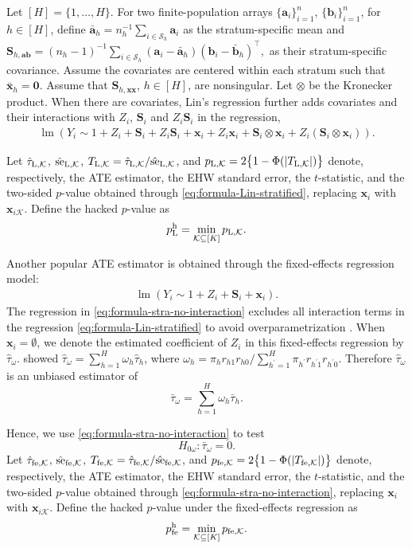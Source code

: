 \documentclass[12pt]{article}
\newcommand{\hpfe}{p_\textnormal{fe}^{\textnormal{h}}}
\newcommand{\se}{\textnormal{se}}
\newcommand{\lmm}{\operatorname{lm}}
\newcommand{\Lin}{\textnormal{L}}
\newcommand{\mk}{\mathcal{K}}
\newcommand{\ms}{\mathcal{S}}
\newcommand{\fe}{\textnormal{fe}}
\newcommand{\bs}{\boldsymbol}
\newcommand{\hpL}{p_\textnormal{L}^{\textnormal{h}}}
\begin{document}
Let $[H] = \{1,\dots,H\}$. For two finite-population arrays $\{\bs{a}_i\}_{i=1}^n$, $\{\bs{b}_i\}_{i=1}^n$, for $h\in [H]$, define $\bar{\bs{a}}_{ h } = n_{ h }^{-1}\sum_{i\in \ms_{ h }} \bs{a}_i$ as the stratum-specific mean and $\bs{S}_{ h, \bs{a}\bs{b}} = (n_{ h }-1)^{-1}\sum_{i\in \ms_{ h }} (\bs{a}_i-\bar{\bs{a}}_{ h })(\bs{b}_i-\bar{\bs{b}}_{ h })^\top,$
as their stratum-specific covariance.  Assume the covariates are centered within each stratum such that $\bar{\bs{x}}_h=\bs{0}$. Assume that $\bs{S}_{h,\bs{x}\bs{x}}$, $h\in [H]$, are nonsingular. Let $\otimes$ be the Kronecker product.
When there are covariates, Lin's regression further adds covariates and their interactions with $Z_i$, $\bs{S}_i$ and $Z_i\bs{S}_i$ in the regression,
\begin{align}
\label{eq:formula-Lin-stratified}
  \lmm(  Y_i \sim 1+ Z_i+\bs{S}_i + Z_i \bs{S}_i + \bs{x}_i+ Z_i\bs{x}_i+\bs{S}_i\otimes\bs{x}_i + Z_i (\bs{S}_i\otimes \bs{x}_i)).
\end{align}


Let $\hat{\tau}_{\Lin,\mk}$, $\hat{\se}_{\Lin,\mk}$, $T_{\Lin,\mk}=\hat{\tau}_{\Lin,\mk}/\hat{\se}_{\Lin,\mk}$, and $ p_{\Lin,\mk} = 2\big\{1-\Phi(|T_{\Lin, \mk}|)\big\}$ denote, respectively, the ATE estimator, the EHW standard error, the $t$-statistic, and the two-sided $p$-value obtained through \eqref{eq:formula-Lin-stratified}, replacing $\bs{x}_i$ with $\bs{x}_{i\mk}$.
Define the hacked $p$-value as $$\hpL = \min_{\mk \subseteq [K]} p_{\Lin, \mk}.$$

Another popular ATE estimator is obtained through the fixed-effects regression model:
\begin{align}
\label{eq:formula-stra-no-interaction}
    \lmm(Y_i \sim 1+ Z_i+\bs{S}_i + \bs{x}_i).
\end{align}
The regression in \eqref{eq:formula-stra-no-interaction} excludes all interaction terms in the regression \eqref{eq:formula-Lin-stratified} to avoid overparametrization \citep{imbens2015causal,duflo2007using,angrist2014opportunity}.  When $\bs{x}_i = \emptyset$, we denote the estimated coefficient of $Z_i$ in this fixed-effects regression by $\hat{\tau}_{\omega}$.  \citet{ding2021frisch} showed
$\hat{\tau}_{\omega} = \sum_{h=1}^H \omega_{ h } \hat{\tau}_{h}$, where $ \omega_h = \pi_{ h } r_{ h 1}r_{ h 0}/\sum_{h^\prime=1}^H \pi_{h^\prime} r_{h^\prime 1}r_{h^\prime 0}$. Therefore $\hat{\tau}_{\omega}$ is an unbiased estimator of $$\bar{\tau}_{\omega} = \sum_{h=1}^H \omega_{ h }  \bar{\tau}_{ h }.$$

Hence, we use \eqref{eq:formula-stra-no-interaction} to test $$H_{0\omega}: \bar{\tau}_{\omega} = 0.$$ Let $\hat{\tau}_{\fe,\mk}$, $\hat{\se}_{\fe,\mk}$, $T_{\fe,\mk}=\hat{\tau}_{\fe,\mk}/\hat{\se}_{\fe,\mk}$, and $ p_{\fe,\mk} = 2\big\{1-\Phi(|T_{\fe,\mk}|)\big\}$ denote, respectively, the ATE estimator, the EHW standard error, the $t$-statistic, and the two-sided $p$-value obtained through \eqref{eq:formula-stra-no-interaction}, replacing $\bs{x}_i$ with $\bs{x}_{i\mk}$.
Define the hacked $p$-value under the fixed-effects regression as $$\hpfe = \min_{\mk \subseteq [K]} p_{\fe, \mk}.$$
\end{document}
